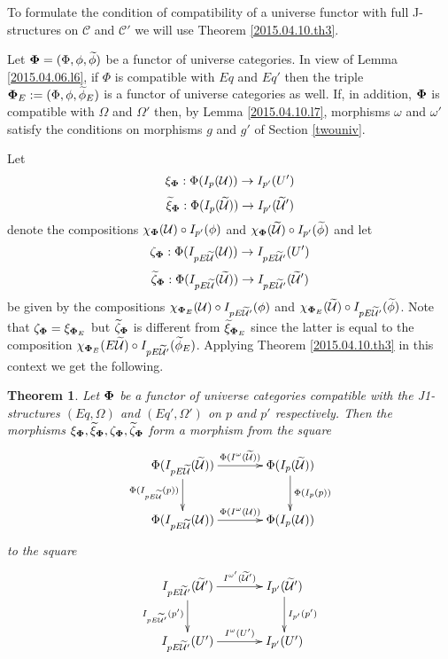 \documentclass[12pt]{article}
\numberwithin{equation}{section}
\newtheorem{theorem}[proposition]{Theorem}
\newcommand{\llabel}[1]{\label{#1}}
\newcommand{\sr}{\rightarrow}
\newcommand{\wt}{\widetilde}
\newcommand{\U}{\mathcal{U}}
\begin{document}
To formulate the condition of compatibility of a universe functor with full
J-structures on $\mathcal C$ and $\mathcal C'$ we will use Theorem
\ref{2015.04.10.th3}.

Let ${\bf\Phi}=(\Phi,\phi,\wt{\phi})$ be a functor of universe categories. In
view of Lemma \ref{2015.04.06.l6}, if $\Phi$ is compatible with $Eq$ and $Eq'$
then the triple ${\bf\Phi}_{E}:=(\Phi,\phi,\wt{\phi}_{E})$ is a functor of
universe categories as well. If, in addition, ${\bf\Phi}$ is compatible with
$\Omega$ and $\Omega'$ then, by Lemma \ref{2015.04.10.l7}, morphisms $\omega$
and $\omega'$ satisfy the conditions on morphisms $g$ and $g'$ of Section
\ref{twouniv}.

Let
%
$$\xi_{\bf\Phi}:\Phi(I_p(\U))\sr I_{p'}(U')$$
$$\wt{\xi}_{\bf\Phi}:\Phi(I_p(\wt{\U}))\sr I_{p'}(\wt{\U}')$$
%
denote the compositions $\chi_{\bf\Phi}(\U)\circ I_{p'}(\phi)$ and
$\chi_{\bf\Phi}(\wt{\U})\circ I_{p'}(\wt{\phi})$ and let
%
$$\zeta_{\bf\Phi}:\Phi(I_{pE\wt{\U}}(\U))\sr I_{pE\wt{\U}'}(U')$$
$$\wt{\zeta}_{\bf\Phi}:\Phi(I_{pE\wt{\U}}(\wt{\U}))\sr I_{pE\wt{\U}'}(\wt{\U}')$$
%
be given by the compositions $\chi_{{\bf\Phi}_{E}}(\U)\circ I_{pE\wt{\U}'}(\phi)$
and $\chi_{{\bf\Phi}_{E}}(\wt{\U})\circ I_{pE\wt{\U}'}(\wt{\phi})$. Note that
$\zeta_{\bf\Phi}=\xi_{{\bf\Phi}_{E}}$ but $\wt{\zeta}_{\bf\Phi}$ is different
from $\wt{\xi}_{{\bf\Phi}_{E}}$ since the latter is equal to the composition
$\chi_{{\bf\Phi}_{E}}(E\wt{\U})\circ I_{pE\wt{\U}'}(\wt{\phi}_{E})$. Applying
Theorem \ref{2015.04.10.th3} in this context we get the following.
%
\begin{theorem}
\llabel{2015.04.10.th1} Let ${\bf\Phi}$ be a functor of universe categories
compatible with the J1-structures $(Eq,\Omega)$ and $(Eq',\Omega')$ on $p$ and
$p'$ respectively. Then the morphisms $\xi_{\bf\Phi}, \wt{\xi}_{\bf\Phi},
\zeta_{\bf\Phi}, \wt{\zeta}_{\bf\Phi}$ form a morphism from the square
%
$$
\begin{xy}
          \xymatrix@C=3pc{ \Phi(I_{pE\wt{\U}}(\wt{\U}))
            \ar[r]^-{\Phi(I^{\omega}(\wt{\U}))} \ar[d]_{\Phi(I_{pE\wt{\U}}(p))} &
            \Phi(I_p(\wt{\U}))\ar[d]^-{\Phi(I_p(p))}\\ \Phi(I_{pE\wt{\U}}(\U))
            \ar[r]^-{\Phi(I^{\omega}(\U))} & \Phi(I_p(\U)) }
\end{xy}
$$
%
to the square
%
$$
\begin{xy}
          \xymatrix@C=3pc{ I_{pE\wt{\U}'}(\wt{\U}')
            \ar[r]^-{I^{\omega'}(\wt{\U}')} \ar[d]_-{I_{pE\wt{\U}'}(p')} &
            I_{p'}(\wt{\U}')\ar[d]^-{I_{p'}(p')}\\ I_{pE\wt{\U}'}(U')
            \ar[r]^-{I^{\omega}(U')} & I_{p'}(U') }
\end{xy}
$$
%
\end{theorem}
\end{document}
